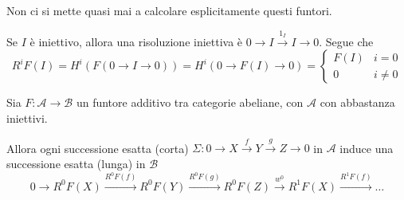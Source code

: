 Non ci si mette quasi mai a calcolare esplicitamente questi funtori.

    
\begin{example}
    Se \(I\) è iniettivo, allora una risoluzione iniettiva è \(0 \to I
    \overset{1_I}{\to} I \to 0\). Segue che 
    \[
      R^{i}F{(I)} = H^{i}{(F{(0 \to I \to 0)})} = H^{i}{(0 \to F{(I)} \to 0)} =
      \begin{cases}{}
          F{(I)} & i = 0\\
          0      & i \neq 0
      \end{cases}
    \]
\end{example}


\begin{theorem}{}\label{thm:funtori-derivati}
Sia \(F : \mathcal{A} \to \mathcal{B}\) un funtore additivo tra categorie
abeliane, con \(\mathcal{A}\) con abbastanza iniettivi.

Allora ogni successione esatta (corta) \(\Sigma : 0 \to X \overset{f}{\to} Y \overset{g}{\to}
Z \to 0\) in \(\mathcal{A}\) induce una successione esatta (lunga) in \(\mathcal{B}\) 
\[
  0 \to R^{0}F{(X)} \overset{R^{0}F{(f)}}{\to} R^{0}F{(Y)}
  \overset{R^{0}F{(g)}}{\to} R^{0}F{(Z)} \overset{w^{0}}{\to} R^{1}F{(X)}
  \overset{R^{1}F{(f)}}{\to} \dots
\]
\end{theorem}

